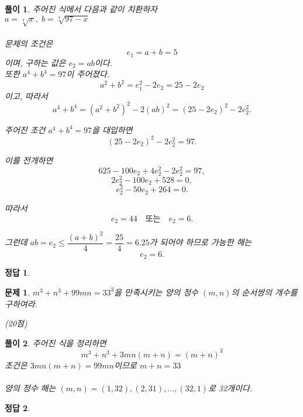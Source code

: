 \documentclass[12pt,a4paper]{article}
\theoremstyle{test_form}
\newtheorem{problem}{문제}[section]
\newtheorem*{solution}{풀이}
\newtheorem*{answer}{정답}
\begin{document}
\begin{solution}
    \setlength{\parindent}{0pt}
    주어진 식에서 다음과 같이 치환하자 \\
    $a=\sqrt[4]{x},\; b=\sqrt[4]{97-x}$
    \\\\
    문제의 조건은
    \[
    e_1 = a+b = 5
    \]
    이며, 구하는 값은 $e_2 = ab$이다.
    \\
    또한 $a^4+b^4=97$이 주어졌다.
    \[
    a^2+b^2 = e_1^2 - 2e_2 = 25 - 2e_2
    \]
    이고, 따라서
    \[
    a^4+b^4 = (a^2+b^2)^2 - 2(ab)^2 = (25-2e_2)^2 - 2e_2^2.
    \]
    
    주어진 조건 $a^4+b^4=97$을 대입하면
    \[
    (25-2e_2)^2 - 2e_2^2 = 97.
    \]
    
    이를 전개하면
    \[
    625 - 100e_2 + 4e_2^2 - 2e_2^2 = 97,
    \]
    \[
    2e_2^2 - 100e_2 + 528 = 0,
    \]
    \[
    e_2^2 - 50e_2 + 264 = 0.
    \]
    
    따라서
    \[
    e_2 = 44 \quad \text{또는} \quad e_2 = 6.
    \]
    
    그런데 $ab=e_2 \leq \dfrac{(a+b)^2}{4} = \dfrac{25}{4}=6.25$가 되어야 하므로 가능한 해는
    \[
    e_2 = 6.
    \]
    
\end{solution}
        
\begin{answer}
\hfill {}
\end{answer}

\newpage

\begin{problem}
\(m^{3}+n^{3}+99mn=33^{3}\)을 만족시키는 양의 정수 \((m,n)\)의 순서쌍의 개수를 구하여라.
\begin{flushright}(20점)\end{flushright}
\end{problem}

   
\begin{solution}
\setlength{\parindent}{0pt}

주어진 식을 정리하면
\[
m^3+n^3+3mn(m+n)=(m+n)^3
\]
조건은 \(3mn(m+n)=99mn\)이므로 \(m+n=33\) \\
\\양의 정수 해는 \((m,n)=(1,32),(2,31),\ldots,(32,1)\)로 32개이다.
\end{solution}

\begin{answer}
\hfill {}
\end{answer}

\newpage
\end{document}
